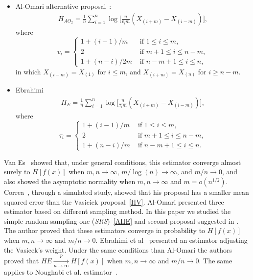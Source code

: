 \documentclass[journal]{IEEEtran}
\begin{document}
\begin{itemize}
		\item Al-Omari alternative proposal~\cite{AlOmari2016}:
		\label{AO2}
		\begin{align}
			H_{{AO}_2}=\frac{1}{n} \sum_{i=1}^{n} \log \Big[\frac{n}{v_{i} m}\left(X_{(i+m)}-X_{(i-m)}\right)\Big],
		\end{align}
		where
		\begin{equation*}
			v_{i}=\begin{cases}
				1+(i-1)/m & \text{ if }1 \leq i \leq m, \\
				2 & \text{ if } m+1 \leq i \leq n-m, \\
				1+(n-i)/2m & \text{ if } n-m+1 \leq i \leq n,
			\end{cases}
		\end{equation*}
		in which $X_{(i-m)}=X_{(1)}$ for $i \leq m$, and $X_{(i+m)}=X_{(n)}$ for $i \geq n-m$.
		\item Ebrahimi~\cite{Ebrahimi94}
		\begin{align}
			H_{E}=\frac{1}{n} \sum_{i=1}^{n} \log \Big[\frac{n}{\tau_{i} m}\left(X_{(i+m)}-X_{(i-m)}\right)\Big],
			\label{HE}
		\end{align}
		where
		\begin{equation*}
			\tau_{i}=\begin{cases}
				1+(i-1)/m & \text{ if }1 \leq i \leq m, \\
				2 & \text{ if } m+1 \leq i \leq n-m, \\
				1+(n-i)/m & \text{ if } n-m+1 \leq i \leq n.
			\end{cases}
		\end{equation*}
	\end{itemize}

Van Es~\cite{VanEs92} showed that, under general conditions, this estimator converge almost surely to $H[f(x)]$ when $m, n \to \infty$, $m/\log(n) \to \infty$, and $m/n \to 0$, and also showed the asymptotic normality when $m, n \to \infty$ and $m = o(n^{1/2})$. 
Correa~\cite{Correa95}, through a simulated study, showed that his proposal has a smaller mean squared error than the Vasiciek proposal~\eqref{HV}. Al-Omari\cite{AlOmari2014} presented three estimator based on different sampling method. In this paper we studied the simple random sampling one (\textit{SRS})~\eqref{AHE} and second proposal suggested
in \cite{AlOmari2016}. The author proved that these estimators converge in probability to $ H[f(x)]$ when $m, n \to \infty  \text{ and } m/n \to 0$. Ebrahimi et al~\cite{Ebrahimi94} presented an estimator adjusting the Vasicek's\cite{Vasicek76} weight. Under the same conditions than Al-Omari\cite{AlOmari2014} the authors proved that $HE\underset{n \to \infty}{\overset{p}{\longrightarrow}} H[f(x)]$ when $m, n \to \infty  \text{ and } m/n \to 0$. The same applies to Noughabi et al. estimator~\cite{Noughabi2010}.
\end{document}
